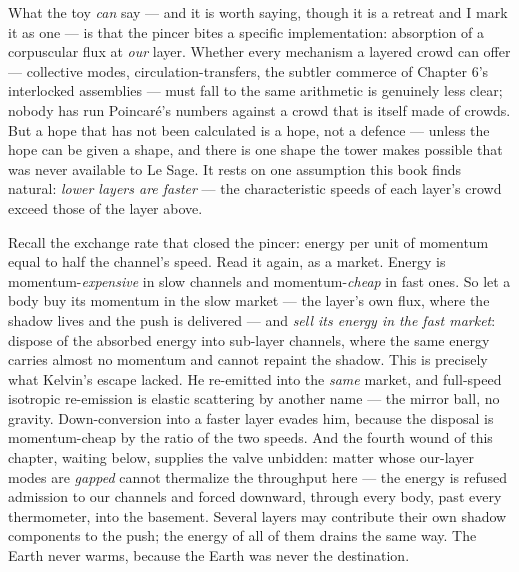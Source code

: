 \documentclass[fontsize=11pt,paper=a4,pagesize=auto,parskip=half-]{scrbook}
\begin{document}
What the toy \emph{can} say --- and it is worth saying, though it is a retreat and I mark it as one --- is that the pincer bites a specific implementation: absorption of a corpuscular flux at \emph{our} layer. Whether every mechanism a layered crowd can offer --- collective modes, circulation-transfers, the subtler commerce of Chapter 6's interlocked assemblies --- must fall to the same arithmetic is genuinely less clear; nobody has run Poincaré's numbers against a crowd that is itself made of crowds. But a hope that has not been calculated is a hope, not a defence --- unless the hope can be given a shape, and there is one shape the tower makes possible that was never available to Le Sage. It rests on one assumption this book finds natural: \emph{lower layers are faster} --- the characteristic speeds of each layer's crowd exceed those of the layer above.

Recall the exchange rate that closed the pincer: energy per unit of momentum equal to half the channel's speed. Read it again, as a market. Energy is momentum-\emph{expensive} in slow channels and momentum-\emph{cheap} in fast ones. So let a body buy its momentum in the slow market --- the layer's own flux, where the shadow lives and the push is delivered --- and \emph{sell its energy in the fast market}: dispose of the absorbed energy into sub-layer channels, where the same energy carries almost no momentum and cannot repaint the shadow. This is precisely what Kelvin's escape lacked. He re-emitted into the \emph{same} market, and full-speed isotropic re-emission is elastic scattering by another name --- the mirror ball, no gravity. Down-conversion into a faster layer evades him, because the disposal is momentum-cheap by the ratio of the two speeds. And the fourth wound of this chapter, waiting below, supplies the valve unbidden: matter whose our-layer modes are \emph{gapped} cannot thermalize the throughput here --- the energy is refused admission to our channels and forced downward, through every body, past every thermometer, into the basement. Several layers may contribute their own shadow components to the push; the energy of all of them drains the same way. The Earth never warms, because the Earth was never the destination.
\end{document}
